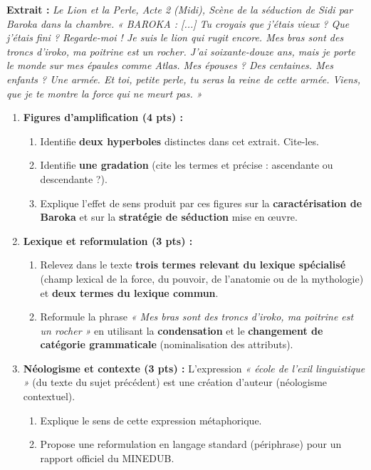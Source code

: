 \documentclass[11pt]{article}
\begin{document}
\begin{exercice}
\textbf{Extrait :} \emph{Le Lion et la Perle, Acte 2 (Midi), Scène de la séduction de Sidi par Baroka dans la chambre.}
\emph{« BAROKA : [...] Tu croyais que j'étais vieux ? Que j'étais fini ? Regarde-moi ! Je suis le lion qui rugit encore. Mes bras sont des troncs d'iroko, ma poitrine est un rocher. J'ai soixante-douze ans, mais je porte le monde sur mes épaules comme Atlas. Mes épouses ? Des centaines. Mes enfants ? Une armée. Et toi, petite perle, tu seras la reine de cette armée. Viens, que je te montre la force qui ne meurt pas. »}

\begin{enumerate}
    \item \textbf{Figures d'amplification (4 pts) :}
    \begin{enumerate}
        \item Identifie \textbf{deux hyperboles} distinctes dans cet extrait. Cite-les.
        \item Identifie \textbf{une gradation} (cite les termes et précise : ascendante ou descendante ?).
        \item Explique l'effet de sens produit par ces figures sur la \textbf{caractérisation de Baroka} et sur la \textbf{stratégie de séduction} mise en œuvre.
    \end{enumerate}
    \item \textbf{Lexique et reformulation (3 pts) :}
    \begin{enumerate}
        \item Relevez dans le texte \textbf{trois termes relevant du lexique spécialisé} (champ lexical de la force, du pouvoir, de l'anatomie ou de la mythologie) et \textbf{deux termes du lexique commun}.
        \item Reformule la phrase \emph{« Mes bras sont des troncs d'iroko, ma poitrine est un rocher »} en utilisant la \textbf{condensation} et le \textbf{changement de catégorie grammaticale} (nominalisation des attributs).
    \end{enumerate}
    \item \textbf{Néologisme et contexte (3 pts) :}
    L'expression \emph{« école de l'exil linguistique »} (du texte du sujet précédent) est une création d'auteur (néologisme contextuel).
    \begin{enumerate}
        \item Explique le sens de cette expression métaphorique.
        \item Propose une reformulation en langage standard (périphrase) pour un rapport officiel du MINEDUB.
    \end{enumerate}
\end{enumerate}
\end{exercice}
\end{document}
